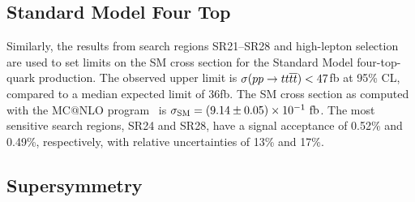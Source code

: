 \subsection{Standard Model Four Top}
\label {sec:results_int_tttt}
Similarly, the results from search regions SR21--SR28 and high-\pt lepton
selection are used to set limits on the SM cross section for the Standard
Model four-top-quark production. The observed upper limit is $\sigma(\relax{p} \relax{p}
\to \relax{t} \relax{t} \overline{\relax{t}} \overline{\relax{t}}) < 47$\unit{fb} at 95\% CL, compared to a
median expected limit of 36\unit{fb}. The SM cross section as computed
with the MC$@$NLO program~\cite{Frixione:2002ik} is $\sigma_{\rm SM} =
\left(9.14\pm0.05\right) \times10^{-1}~{\rm fb}$. The most sensitive search
regions, SR24 and SR28, have a signal acceptance of 0.52\% and 0.49\%,
respectively, with relative uncertainties of 13\% and 17\%.

\subsection{Supersymmetry}
\label {sec:results_int_susy}

